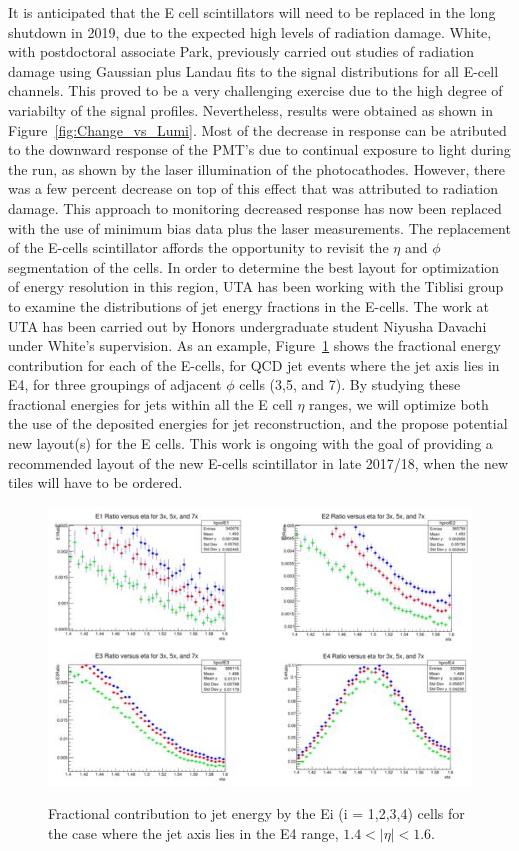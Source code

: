 It is anticipated that the E cell scintillators will need to be replaced in the long 
shutdown in 2019, due to the expected high levels of radiation damage. White, with postdoctoral
associate Park, previously carried out studies of radiation damage using Gaussian plus
Landau fits to the signal distributions for all E-cell channels. This proved to be a very
challenging exercise due to the high degree of variabilty of the signal profiles.
Nevertheless, results were obtained as shown in Figure~\ref{fig:Change_vs_Lumi}. Most of the
decrease in response can be atributed to the downward response of the PMT's due to continual 
exposure to light during the run, as shown by the laser illumination of the photocathodes. 
However, there was a few percent decrease on top of this effect that was attributed to radiation 
damage. This approach to monitoring decreased response has now been replaced with the use of 
minimum bias data plus the laser measurements.
The replacement of the E-cells scintillator affords the opportunity to revisit the $\eta$ and $\phi$ 
segmentation of the cells. In order to determine the best layout for optimization of energy 
resolution in this region, UTA has been working with the Tiblisi group to examine the distributions
of jet energy fractions in the E-cells. The work at UTA has been carried out by Honors
undergraduate student Niyusha Davachi under White's supervision. As an example, Figure~\ref{fig:E4_Energy_ratios} 
shows the fractional energy contribution for each of the E-cells, for QCD jet events where the jet axis lies in E4,
for three groupings of adjacent $\phi$ cells (3,5, and 7). By studying these fractional energies for jets within all 
the E cell $\eta$ ranges, we will optimize both the use of the deposited energies for jet reconstruction, 
and the propose potential new layout(s) for the E cells. This work is ongoing with the
goal of providing a recommended layout of the new E-cells scintillator in late 2017/18, when the new tiles will 
have to be ordered. 

\begin{figure}[htb]
\centering

      \includegraphics[scale=0.6]{images/E4_Energy_ratios.jpg}
      \label{fig:E4_Energy_ratios}

\caption{Fractional contribution to jet energy by the Ei (i = 1,2,3,4) cells for the case where the jet axis 
lies in the E4 range, $1.4 < |\eta| < 1.6$.}
\end{figure}

